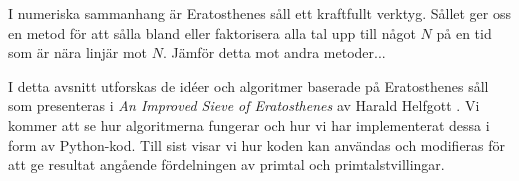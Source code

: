 I numeriska sammanhang är Eratosthenes såll ett kraftfullt verktyg.
Sållet ger oss en metod för att sålla bland eller faktorisera alla tal upp till något $N$ på en tid som är nära linjär mot $N$.
Jämför detta mot andra metoder...

I detta avsnitt utforskas de idéer och algoritmer baserade på Eratosthenes såll som presenteras i \textit{An Improved Sieve of Eratosthenes} av Harald Helfgott \cite{HaraldSieve}.
Vi kommer att se hur algoritmerna fungerar och hur vi har implementerat dessa i form av Python-kod.
Till sist visar vi hur koden kan användas och modifieras för att ge resultat angående fördelningen av primtal och primtalstvillingar.



